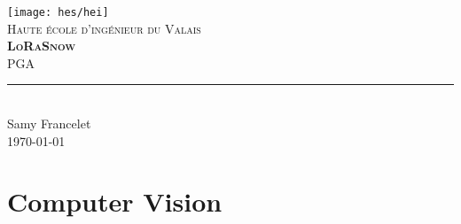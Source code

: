 \documentclass[11pt,titlepage]{report}
\begin{document}
\begin{titlepage}
	\centering
    \texttt{[image: hes/hei]}\\[1cm] 	%
    \textsc{\LARGE Haute école d'ingénieur du Valais}\\ \vspace{\fill}
    \textbf{\textsc{\fontsize{35}{35}\selectfont LoRaSnow}}\\ \vspace{\fill}
	\textsc{\LARGE PGA}\\[0.4cm]
	\rule{\linewidth}{0.2 mm} \\[0.5 cm]
	Samy Francelet \\
	\today
\end{titlepage}
\restoregeometry

\tableofcontents

\chapter{Computer Vision}


\printbibliography[heading=bibintoc]
\end{document}
